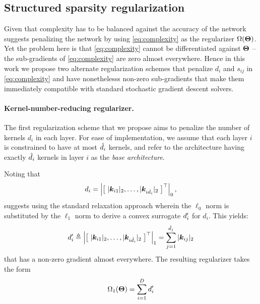 \subsection{Structured sparsity regularization} 
Given that complexity has to be balanced against the accuracy of the network suggests penalizing the network by using \eqref{eq:complexity} as the regularizer $\Omega( \bm{\Theta} )$. Yet the problem here is that \eqref{eq:complexity} cannot be differentiated against $\bm{\Theta}$ -- the sub-gradients of \eqref{eq:complexity} are zero almost everywhere. Hence in this work we propose two alternate regularization schemes that penalize $d_i$ and $s_{ij}$ in \eqref{eq:complexity} and have nonethelesss non-zero sub-gradients that make them immediately compatible with standard stochastic gradient descent solvers. 

\paragraph{Kernel-number-reducing regularizer.} The first regularization scheme that we propose aims to penalize the number of kernels $d_i$ in each layer. For ease of implementation, we assume that each layer $i$ is constrained to have at most $\hat{d}_i$ kernels, and refer to the architecture having exactly $\hat{d}_i$ kernels in layer $i$ as the \emph{base architecture}. 

Noting that 
\begin{equation} \label{eq:di_l0}
d_i = \left | \big [\; |\bm{k}_{i1}|_2, \ldots, |\bm{k}_{i\hat{d}_i}|_2  \; \big ]^{\top} \right |_0,
\end{equation}
 
suggests using the standard relaxation approach wherein the $\ell_0$ norm is substituted by the $\ell_1$ norm to derive a convex surrogate $d^\prime_i$ for $d_i$. This yields:
\begin{equation} \label{eq:drlx}
d^\prime_i \triangleq \left | \big [\; |\bm{k}_{i1}|_2, \ldots, |\bm{k}_{i\hat{d}_i}|_2  \; \big ]^{\top} \right |_1 = \sum_{j=1}^{\hat{d}_j} |\bm{k}_{ij}|_2
\end{equation}
that has a non-zero gradient almost everywhere. The resulting regularizer takes the form
\begin{equation}\label{eq:reg1}
\Omega_1(\mm \Theta) = \sum_{i=1}^D \drlx_i %
\end{equation}

